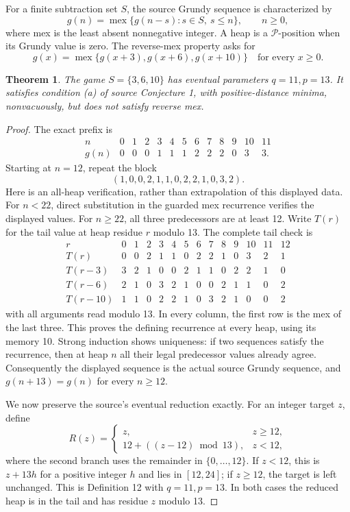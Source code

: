 \documentclass[11pt]{article}
\newtheorem{theorem}{Theorem}
\newcommand{\mex}{\operatorname{mex}}
\begin{document}
For a finite subtraction set $S$, the source Grundy sequence is characterized by
\[
 g(n)=\mex\{g(n-s):s\in S,\ s\le n\},\qquad n\ge0,
\]
where mex is the least absent nonnegative integer. A heap is a $\mathcal P$-position when its Grundy value is zero. The reverse-mex property asks for
\[
 g(x)=\mex\{g(x+3),g(x+6),g(x+10)\}\quad\text{for every }x\ge0.
\]
\begin{theorem}
The game $S=\{3,6,10\}$ has eventual parameters $q=11,p=13$. It satisfies condition (a) of source Conjecture 1, with positive-distance minima, nonvacuously, but does not satisfy reverse mex.
\end{theorem}
\begin{proof}
The exact prefix is
\[
\begin{array}{c|rrrrrrrrrrrr}
n&0&1&2&3&4&5&6&7&8&9&10&11\\\hline
g(n)&0&0&0&1&1&1&2&2&2&0&3&3.
\end{array}
\]
Starting at $n=12$, repeat the block
\[
 (1,0,0,2,1,1,0,2,2,1,0,3,2).
\]
Here is an all-heap verification, rather than extrapolation of this displayed data. For $n<22$, direct substitution in the guarded mex recurrence verifies the displayed values. For $n\ge22$, all three predecessors are at least 12. Write $T(r)$ for the tail value at heap residue $r$ modulo 13. The complete tail check is
\[
\begin{array}{c|rrrrrrrrrrrrr}
r&0&1&2&3&4&5&6&7&8&9&10&11&12\\\hline
T(r)&0&0&2&1&1&0&2&2&1&0&3&2&1\\
T(r-3)&3&2&1&0&0&2&1&1&0&2&2&1&0\\
T(r-6)&2&1&0&3&2&1&0&0&2&1&1&0&2\\
T(r-10)&1&1&0&2&2&1&0&3&2&1&0&0&2
\end{array}
\]
with all arguments read modulo 13. In every column, the first row is the mex of the last three. This proves the defining recurrence at every heap, using its memory 10. Strong induction shows uniqueness: if two sequences satisfy the recurrence, then at heap $n$ all their legal predecessor values already agree. Consequently the displayed sequence is the actual source Grundy sequence, and $g(n+13)=g(n)$ for every $n\ge12$.

We now preserve the source's eventual reduction exactly. For an integer target $z$, define
\[
 R(z)=\begin{cases}z,&z\ge12,\\12+((z-12)\bmod13),&z<12,\end{cases}
\]
where the second branch uses the remainder in $\{0,\ldots,12\}$. If $z<12$, this is $z+13h$ for a positive integer $h$ and lies in $[12,24]$; if $z\ge12$, the target is left unchanged. This is Definition 12 with $q=11,p=13$. In both cases the reduced heap is in the tail and has residue $z$ modulo 13.


\end{proof}
\end{document}
